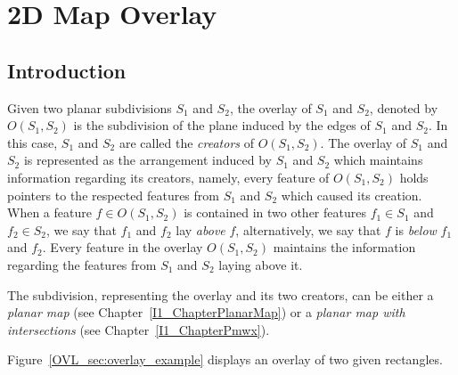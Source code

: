 \def\Ipe#1{\def\IPEfile{#1}}

\renewcommand{\Re}{{\rm I\!\hspace{-0.025em} R}}

\def\C{{\cal C}}
\def\G{{\cal G}}
\def\F{{\cal F}}
\def\I{{\cal I}}
\def\U{{\cal U}}
\def\M{{\cal M}}
\def\eps{{\varepsilon}}
\def\bd{{\partial}}
\def\dm{{\cal D}}

\chapter{2D Map Overlay} 
\label{I1_ChapterMapOverlay_2}

\section{Introduction}
\label{OVL_sec:example}

Given two planar subdivisions $S_1$ and $S_2$, the overlay of 
$S_1$ and $S_2$, denoted by $O(S_1,S_2)$ is the subdivision 
of the plane induced by the edges of $S_1$ and $S_2$.
In this case, $S_1$ and $S_2$ are called the {\em creators} 
of $O(S_1,S_2)$. The overlay of $S_1$ and $S_2$ is represented as the 
arrangement induced by $S_1$ and $S_2$ which maintains information 
regarding its creators, namely, every feature of $O(S_1,S_2)$ holds pointers 
to the respected features from $S_1$ and $S_2$ which caused its creation.
When a feature $f \in O(S_1,S_2)$ is contained in two other features 
$f_1 \in S_1$ and $f_2 \in S_2$, we say that $f_1$ and $f_2$ 
lay {\em above} $f$, alternatively, we say that 
$f$ is {\em below} $f_1$ and $f_2$.
Every feature in the overlay $O(S_1, S_2)$ maintains the 
information regarding the features from $S_1$ and $S_2$ laying above it.

The subdivision, representing the overlay and its two creators, 
can be either a {\it planar map} 
(see Chapter~\ref{I1_ChapterPlanarMap}) 
or a {\it planar map with intersections} 
(see Chapter~\ref{I1_ChapterPmwx}).

Figure~\ref{OVL_sec:overlay_example} displays an overlay of two given rectangles.


